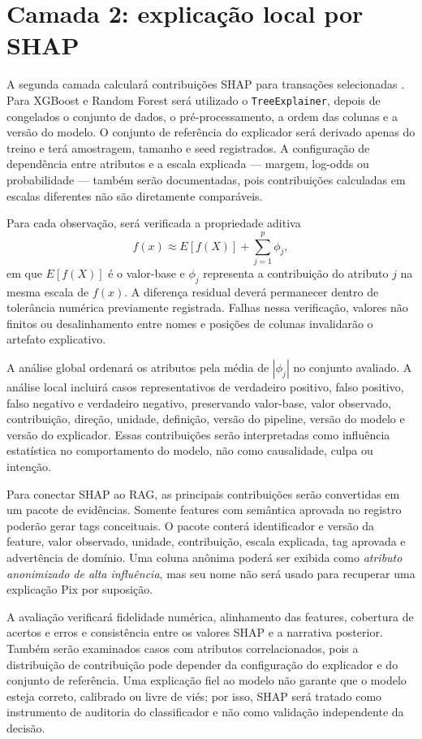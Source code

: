 \section{Camada 2: explicação local por SHAP}

A segunda camada calculará contribuições SHAP para transações selecionadas \cite{lundberg2017unified}. Para XGBoost e Random Forest será utilizado o \texttt{TreeExplainer}, depois de congelados o conjunto de dados, o pré-processamento, a ordem das colunas e a versão do modelo. O conjunto de referência do explicador será derivado apenas do treino e terá amostragem, tamanho e seed registrados. A configuração de dependência entre atributos e a escala explicada --- margem, log-odds ou probabilidade --- também serão documentadas, pois contribuições calculadas em escalas diferentes não são diretamente comparáveis.

Para cada observação, será verificada a propriedade aditiva
\begin{equation}
    f(x) \approx E[f(X)] + \sum_{j=1}^{p} \phi_j,
\end{equation}
em que $E[f(X)]$ é o valor-base e $\phi_j$ representa a contribuição do atributo $j$ na mesma escala de $f(x)$. A diferença residual deverá permanecer dentro de tolerância numérica previamente registrada. Falhas nessa verificação, valores não finitos ou desalinhamento entre nomes e posições de colunas invalidarão o artefato explicativo.

A análise global ordenará os atributos pela média de $|\phi_j|$ no conjunto avaliado. A análise local incluirá casos representativos de verdadeiro positivo, falso positivo, falso negativo e verdadeiro negativo, preservando valor-base, valor observado, contribuição, direção, unidade, definição, versão do pipeline, versão do modelo e versão do explicador. Essas contribuições serão interpretadas como influência estatística no comportamento do modelo, não como causalidade, culpa ou intenção.

Para conectar SHAP ao RAG, as principais contribuições serão convertidas em um pacote de evidências. Somente features com semântica aprovada no registro poderão gerar tags conceituais. O pacote conterá identificador e versão da feature, valor observado, unidade, contribuição, escala explicada, tag aprovada e advertência de domínio. Uma coluna anônima poderá ser exibida como \emph{atributo anonimizado de alta influência}, mas seu nome não será usado para recuperar uma explicação Pix por suposição.

A avaliação verificará fidelidade numérica, alinhamento das features, cobertura de acertos e erros e consistência entre os valores SHAP e a narrativa posterior. Também serão examinados casos com atributos correlacionados, pois a distribuição de contribuição pode depender da configuração do explicador e do conjunto de referência. Uma explicação fiel ao modelo não garante que o modelo esteja correto, calibrado ou livre de viés; por isso, SHAP será tratado como instrumento de auditoria do classificador e não como validação independente da decisão.

